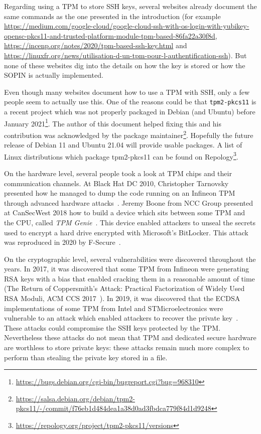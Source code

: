 Regarding using a TPM to store SSH keys, several websites already
document the same commands as the one presented in the introduction (for
example
\url{https://medium.com/google-cloud/google-cloud-ssh-with-os-login-with-yubikey-opensc-pkcs11-and-trusted-platform-module-tpm-based-86fa22a30f8d},
\url{https://incenp.org/notes/2020/tpm-based-ssh-key.html} and
\url{https://linuxfr.org/news/utilisation-d-un-tpm-pour-l-authentification-ssh}).
But none of these websites dig into the details on how the key is stored
or how the SOPIN is actually implemented.

Even though many websites document how to use a TPM with SSH, only a few
people seem to actually use this. One of the reasons could be that
\texttt{tpm2-pkcs11} is a recent project which was not
properly packaged in Debian (and Ubuntu) before January 2021\footnote{\url{https://bugs.debian.org/cgi-bin/bugreport.cgi?bug=968310}}.
The author of this document helped fixing this and his contribution was
acknowledged by the package maintainer\footnote{\url{https://salsa.debian.org/debian/tpm2-pkcs11/-/commit/f76eb1d484dea1a38d0ad3fbdca779f84d1d9248}}.
Hopefully the future release of Debian 11 and Ubuntu 21.04 will provide
usable packages. A list of Linux distributions which package tpm2-pkcs11
can be found on Repology\footnote{\url{https://repology.org/project/tpm2-pkcs11/versions}}.

On the hardware level, several people took a look at TPM chips and their
communication channels. At Black Hat DC 2010, Christopher Tarnovsky
presented how he managed to dump the code running on an Infineon TPM
through advanced hardware
attacks~\cite{protectingsshauthenticationwithtpm20:bhdc2010}. Jeremy
Boone from NCC Group presented at CanSecWest 2018 how to build a device
which sits between some TPM and the CPU, called \emph{TPM
Genie}~\cite{protectingsshauthenticationwithtpm20:tpmgenie}. This device
enabled attackers to unseal the secrets used to encrypt a hard drive
encrypted with Microsoft's BitLocker. This attack was reproduced in 2020
by F-Secure~\cite{protectingsshauthenticationwithtpm20:fsecurebitlocker}.

On the cryptographic level, several vulnerabilities were discovered
throughout the years. In 2017, it was discovered that some TPM from
Infineon were generating RSA keys with a bias that enabled cracking them
in a reasonable amount of time (The Return of Coppersmith's Attack:
Practical Factorization of Widely Used RSA Moduli, ACM CCS
2017~\cite{protectingsshauthenticationwithtpm20:nemec2017return}). In
2019, it was discovered that the ECDSA implementations of some TPM from
Intel and STMicroelectronics were vulnerable to an attack which enabled
attackers to recover the private
key~\cite{protectingsshauthenticationwithtpm20:moghimi2020tpm}. These
attacks could compromise the SSH keys protected by the TPM. Nevertheless
these attacks do not mean that TPM and dedicated secure hardware are
worthless to store private keys: these attacks remain much more complex
to perform than stealing the private key stored in a file.

